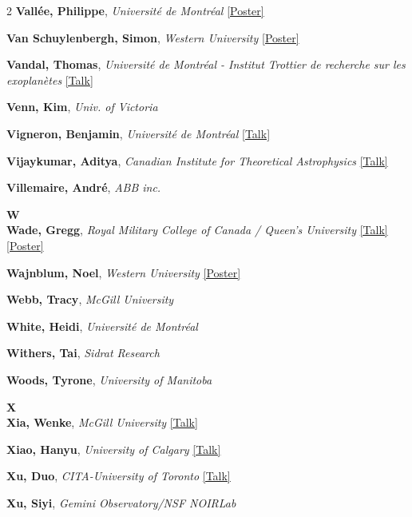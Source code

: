 \begin{small}
\begin{multicols}{2}
\textbf{Vallée, Philippe}, {\footnotesize\textit{Université de Montréal}} \hyperref[poster-abstract-page-talk-170]{\scriptsize\textcolor{cascateal}{[Poster]}}\par
\textbf{Van Schuylenbergh, Simon}, {\footnotesize\textit{Western University}} \hyperref[poster-abstract-page-talk-314]{\scriptsize\textcolor{cascateal}{[Poster]}}\par
\textbf{Vandal, Thomas}, {\footnotesize\textit{Université de Montréal - Institut Trottier de recherche sur les exoplanètes}} \hyperref[abstract-page-talk-233]{\scriptsize\textcolor{cascablue}{[Talk]}}\par
\textbf{Venn, Kim}, {\footnotesize\textit{Univ. of Victoria}}\par
\textbf{Vigneron, Benjamin}, {\footnotesize\textit{Université de Montréal}} \hyperref[abstract-page-talk-5]{\scriptsize\textcolor{cascablue}{[Talk]}}\par
\textbf{Vijaykumar, Aditya}, {\footnotesize\textit{Canadian Institute for Theoretical Astrophysics}} \hyperref[abstract-page-talk-262]{\scriptsize\textcolor{cascablue}{[Talk]}}\par
\textbf{Villemaire, André}, {\footnotesize\textit{ABB inc.}}\par

{\sffamily\bfseries\color{cascablue}\large W}\\[2pt]

\textbf{Wade, Gregg}, {\footnotesize\textit{Royal Military College of Canada / Queen's University}} \hyperref[abstract-page-talk-11]{\scriptsize\textcolor{cascablue}{[Talk]}} \hyperref[poster-abstract-page-talk-57]{\scriptsize\textcolor{cascateal}{[Poster]}}\par
\textbf{Wajnblum, Noel}, {\footnotesize\textit{Western University}} \hyperref[poster-abstract-page-talk-125]{\scriptsize\textcolor{cascateal}{[Poster]}}\par
\textbf{Webb, Tracy}, {\footnotesize\textit{McGill University}}\par
\textbf{White, Heidi}, {\footnotesize\textit{Université de Montréal}}\par
\textbf{Withers, Tai}, {\footnotesize\textit{Sidrat Research}}\par
\textbf{Woods, Tyrone}, {\footnotesize\textit{University of Manitoba}}\par

{\sffamily\bfseries\color{cascablue}\large X}\\[2pt]

\textbf{Xia, Wenke}, {\footnotesize\textit{McGill University}} \hyperref[abstract-page-talk-248]{\scriptsize\textcolor{cascablue}{[Talk]}}\par
\textbf{Xiao, Hanyu}, {\footnotesize\textit{University of Calgary}} \hyperref[abstract-page-talk-259]{\scriptsize\textcolor{cascablue}{[Talk]}}\par
\textbf{Xu, Duo}, {\footnotesize\textit{CITA-University of Toronto}} \hyperref[abstract-page-talk-35]{\scriptsize\textcolor{cascablue}{[Talk]}}\par
\textbf{Xu, Siyi}, {\footnotesize\textit{Gemini Observatory/NSF NOIRLab}}\par


\end{multicols}
\end{small}

